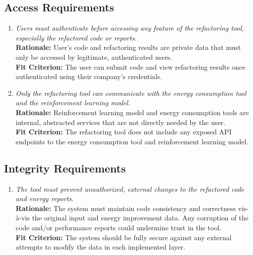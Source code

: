 \documentclass[12pt]{article}
\begin{document}
\subsection{Access Requirements}
\begin{enumerate}[label=SR-AR \arabic*., wide=0pt, leftmargin=*]
	\item \emph{Users must authenticate before accessing any feature of the refactoring tool, especially the refactored code or reports.}\\
    {\bf Rationale:} User’s code and refactoring results are private data that must only be accessed by legitimate, authenticated users. \\
    {\bf Fit Criterion:} The user can submit code and view refactoring results once authenticated using their company’s credentials.
  \item \emph{Only the refactoring tool can communicate with the energy consumption tool and the reinforcement learning model.}\\
  {\bf Rationale:} Reinforcement learning model and energy consumption tools are internal, abstracted services that are not directly needed by the user.\\
  {\bf Fit Criterion:} The refactoring tool does not include any exposed API endpoints to the energy consumption tool and reinforcement learning model.
\end{enumerate}
\subsection{Integrity Requirements}
\begin{enumerate}[label=SR-IR \arabic*., wide=0pt, leftmargin=*]
	\item \emph{The tool must prevent unauthorized, external changes to the refactored code and energy reports.}\\
    {\bf Rationale:} The system must maintain code consistency and correctness vis-à-vis the original input and energy improvement data. Any corruption of the code and/or performance reports could undermine trust in the tool.\\
    {\bf Fit Criterion:} The system should be fully secure against any external attempts to modify the data in each implemented layer.
\end{enumerate}
\end{document}
